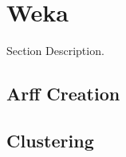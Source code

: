 \section{Weka}
\label{sect:weka}
Section Description.  

\subsection{Arff Creation}

\subsection{Clustering}

